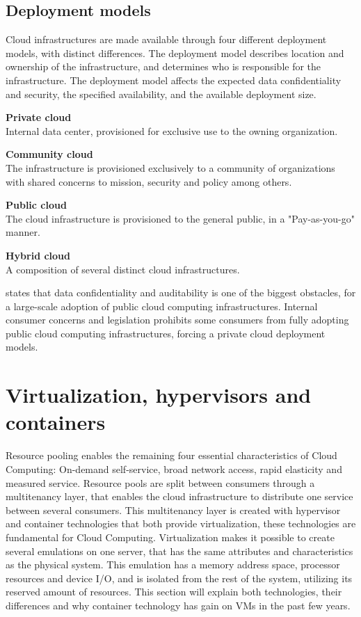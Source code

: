\subsection{Deployment models}
Cloud infrastructures are made available through four different deployment models, with distinct differences. The deployment model describes  location and ownership of the infrastructure, and determines who is responsible for the infrastructure. The deployment model affects the expected data confidentiality and security, the specified availability, and the available deployment size.


\textbf{Private cloud}\\
Internal data center, provisioned for exclusive use to the owning organization.

\textbf{Community cloud}\\
The infrastructure is provisioned exclusively to a community of organizations with shared concerns to mission, security and policy among others.

\textbf{Public cloud}\\
The cloud infrastructure is provisioned to the general public, in a "Pay-as-you-go" manner.

\textbf{Hybrid cloud}\\
A composition of several distinct cloud infrastructures.


\citeauthor{armbrust2010view} states that data confidentiality and auditability is one of the biggest obstacles, for a large-scale adoption of public cloud computing infrastructures. Internal consumer concerns and legislation prohibits some consumers from fully adopting public cloud computing infrastructures, forcing a private cloud deployment models. 


\section{Virtualization, hypervisors and containers}
Resource pooling enables the remaining four essential characteristics of Cloud Computing: On-demand self-service, broad network access, rapid elasticity and measured service\cite{bittman2009server}. Resource pools are split  between consumers through a multitenancy layer, that enables the cloud infrastructure to distribute one service between several consumers\cite{krebs2012architectural}. This multitenancy layer is created with hypervisor and container technologies that both provide virtualization, these technologies are fundamental for Cloud Computing. Virtualization makes it possible to create several emulations on one server, that has the same attributes and characteristics as the physical system. This emulation has a memory address space, processor resources and device I/O, and is isolated from the rest of the system, utilizing its reserved amount of resources. This section will explain both technologies, their differences and why container technology has gain on VMs in the past few years.

